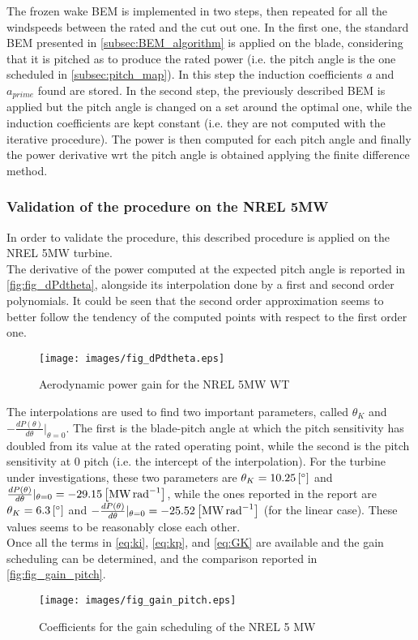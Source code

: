 The frozen wake BEM is implemented in two steps, then repeated for all the windspeeds between the rated and the cut out one. In the first one, the standard BEM presented in \autoref{subsec:BEM_algorithm} is applied on the blade, considering that it is pitched as to produce the rated power (i.e. the pitch angle is the one scheduled in \autoref{subsec:pitch_map}). In this step the induction coefficients \textit{a} and \textit{$a_{prime}$} found are stored. In the second step, the previously described BEM is applied but the pitch angle is changed on a set around the optimal one, while the induction coefficients are kept constant (i.e. they are not computed with the iterative procedure). The power is then computed for each pitch angle and finally the power derivative wrt the pitch angle is obtained applying the finite difference method.

\subsubsection{Validation of the procedure on the NREL 5MW}
In order to validate the procedure, this described procedure is applied on the NREL 5MW turbine.\\
The derivative of the power computed at the expected pitch angle is  reported in \autoref{fig:fig_dPdtheta}, alongside its interpolation done by a first and second order polynomials. It could be seen that the second order approximation seems to better follow the tendency of the computed points with respect to the first order one. 
\begin{figure}[htb]
    \centering
    \texttt{[image: images/fig\_dPdtheta.eps]}
    \caption{Aerodynamic power gain for the NREL 5MW WT}
    \label{fig:fig_dPdtheta}
\end{figure}

The interpolations are used to find two important parameters, called $\theta_{K}$ and  $-\frac{dP(\theta)}{d\theta}\vert_{\theta=0}$. The first is the blade-pitch angle at which the pitch sensitivity has doubled from its value at the rated operating point, while the second is the pitch sensitivity at 0 pitch (i.e. the intercept of the interpolation). For the turbine under investigations, these two parameters are $\theta_K=10.25 \left[\si{\degree}\right]$ and  $\frac{dP(\theta)}{d\theta}\vert_{\theta=0} = -29.15 \left[\si{\mega\watt\per\radian}\right]$, while the ones reported in the report are $\theta_K=6.3 \left[\si{\degree}\right]$ and  $-\frac{dP(\theta)}{d\theta}\vert_{\theta=0} = -25.52\left[\si{\mega\watt\per\radian}\right]$ (for the linear case). These values seems to be reasonably close each other.\\ 
Once all the terms in \autoref{eq:ki}, \ref{eq:kp}, and \ref{eq:GK} are available and the gain scheduling can be determined, and the comparison reported in \autoref{fig:fig_gain_pitch}.
\begin{figure}[htb]
    \centering
    \texttt{[image: images/fig\_gain\_pitch.eps]}
    \caption{Coefficients for the gain scheduling of the NREL 5 MW }
    \label{fig:fig_gain_pitch}
\end{figure}


